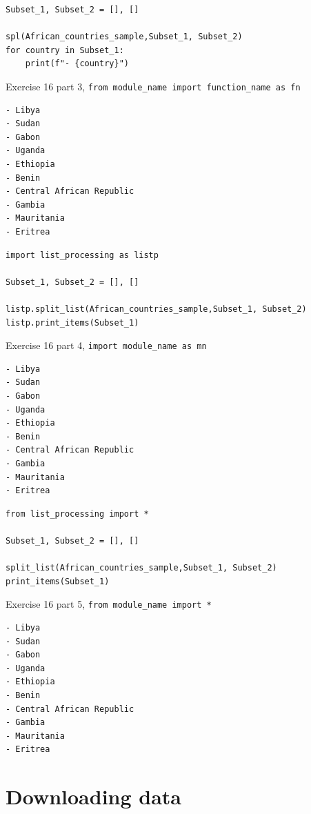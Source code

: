 \documentclass[10pt]{book}
\newenvironment{code}{\captionsetup{labelfont=bf, type=listing, name=Snippet, aboveskip=-3pt ,belowskip=15pt}}{}
\begin{document}
\begin{enumerate}
\begin{code}
\begin{verbatim}
Subset_1, Subset_2 = [], []

spl(African_countries_sample,Subset_1, Subset_2)
for country in Subset_1:
    print(f"- {country}")
\end{verbatim}
\caption{\label{lst:orgb9b67c5}Exercise 16 part 3, \texttt{from module\_name import function\_name as fn}}
\end{code}

\label{org66d51ef}
\begin{verbatim}
- Libya
- Sudan
- Gabon
- Uganda
- Ethiopia
- Benin
- Central African Republic
- Gambia
- Mauritania
- Eritrea
\end{verbatim}

\label{org4ec41be}
\begin{code}
\begin{verbatim}
import list_processing as listp

Subset_1, Subset_2 = [], []

listp.split_list(African_countries_sample,Subset_1, Subset_2)
listp.print_items(Subset_1)
\end{verbatim}
\caption{\label{lst:orgcda4ae2}Exercise 16 part 4, \texttt{import module\_name as mn}}
\end{code}

\label{org9235ef8}
\begin{verbatim}
- Libya
- Sudan
- Gabon
- Uganda
- Ethiopia
- Benin
- Central African Republic
- Gambia
- Mauritania
- Eritrea
\end{verbatim}

\label{org2017463}
\begin{code}
\begin{verbatim}
from list_processing import * 

Subset_1, Subset_2 = [], []

split_list(African_countries_sample,Subset_1, Subset_2)
print_items(Subset_1)
\end{verbatim}
\caption{\label{lst:org6832850}Exercise 16 part 5, \texttt{from module\_name import *}}
\end{code}

\label{org4c64a6f}
\begin{verbatim}
- Libya
- Sudan
- Gabon
- Uganda
- Ethiopia
- Benin
- Central African Republic
- Gambia
- Mauritania
- Eritrea
\end{verbatim}

\setcounter{chapter}{15}
\end{enumerate}
\chapter{Downloading data}
\label{sec:orgea97db4}
\end{document}
